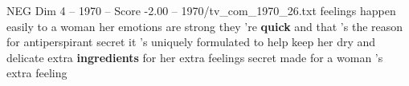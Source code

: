 \begin{textsample}{NEG Dim 4 – 1970 – Score -2.00 – 1970/tv\_com\_1970\_26.txt}  \label{ex:f4_neg_053}
feelings happen easily to a woman her emotions are strong they 're \textbf{quick} and that 's the reason for antiperspirant secret it 's uniquely formulated to help keep her dry and delicate extra \textbf{ingredients} for her extra feelings secret made for a woman 's extra feeling

\end{textsample}
